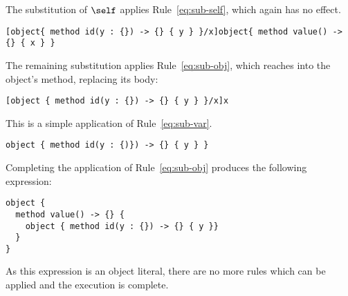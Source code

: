 \begin{scope}
  \noindent The substitution of $\self$ applies Rule~\ref{eq:sub-self}, which
  again has no effect.

  \begin{lstlisting}
[object{ method id(y : {}) -> {} { y } }/x]object{ method value() -> {} { x } }
  \end{lstlisting}

  \noindent The remaining substitution applies Rule~\ref{eq:sub-obj}, which
  reaches into the object's method, replacing its body:

  \begin{lstlisting}
[object { method id(y : {}) -> {} { y } }/x]x
  \end{lstlisting}

  \noindent This is a simple application of Rule~\ref{eq:sub-var}.

  \begin{lstlisting}
object { method id(y : {)}) -> {} { y } }
  \end{lstlisting}

  \noindent Completing the application of Rule~\ref{eq:sub-obj} produces the
  following expression:

  \begin{lstlisting}
object {
  method value() -> {} {
    object { method id(y : {}) -> {} { y }}
  }
}
  \end{lstlisting}

  \noindent As this expression is an object literal, there are no more rules
  which can be applied and the execution is complete.
\end{scope}

